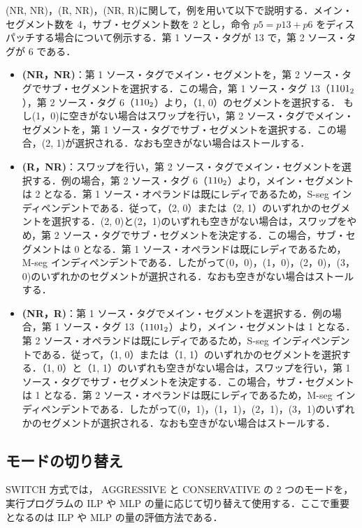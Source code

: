 (NR, NR)，(R, NR)，(NR, R)に関して，例を用いて以下で説明する．メイン・セグメント数を 4，サブ・セグメント数を 2 とし，命令 $p5 = p13 + p6$ をディスパッチする場合について例示する．第 1 ソース・タグが 13 で，第 2 ソース・タグが 6 である．
\begin{itemize}
  \item \textbf{(NR，NR)}：第 1 ソース・タグでメイン・セグメントを，第 2 ソース・タグでサブ・セグメントを選択する．この場合，第 1 ソース・タグ 13（${\rm 1101_2}$），第 2 ソース・タグ 6（${\rm 110_2}$）より，（1, 0）のセグメントを選択する． もし(1，0)に空きがない場合はスワップを行い，第 2 ソース・タグでメイン・セグメントを，第 1 ソース・タグでサブ・セグメントを選択する．この場合，(2, 1)が選択される．なおも空きがない場合はストールする．
  \item \textbf{(R，NR)}：スワップを行い，第 2 ソース・タグでメイン・セグメントを選択する．例の場合，第 2 ソース・タグ 6（${\rm 110_2}$）より，メイン・セグメントは 2 となる．第 1 ソース・オペランドは既にレディであるため，S-seg インディペンデントである．従って，（2, 0）または（2, 1）のいずれかのセグメントを選択する．(2, 0)と(2，1)のいずれも空きがない場合は，スワップをやめ，第 2 ソース・タグでサブ・セグメントを決定する．この場合，サブ・セグメントは 0 となる．第 1 ソース・オペランドは既にレディであるため，M-seg インディペンデントである．したがって(0，0)，(1，0)，(2，0)，(3，0)のいずれかのセグメントが選択される．なおも空きがない場合はストールする．
  \item \textbf{(NR，R)}：第 1 ソース・タグでメイン・セグメントを選択する．例の場合，第 1 ソース・タグ 13（${\rm 1101_2}$）より，メイン・セグメントは 1 となる．第 2 ソース・オペランドは既にレディであるため，S-seg インディペンデントである．従って，（1, 0）または（1, 1）のいずれかのセグメントを選択する．（1, 0）と（1, 1）のいずれも空きがない場合は，スワップを行い，第 1 ソース・タグでサブ・セグメントを決定する．この場合，サブ・セグメントは 1 となる．第 2 ソース・オペランドは既にレディであるため，M-seg インディペンデントである．したがって(0，1)，(1，1)，(2，1)，(3，1)のいずれかのセグメントが選択される．なおも空きがない場合はストールする．
\end{itemize}


\subsection{モードの切り替え}
SWITCH 方式では， AGGRESSIVE と CONSERVATIVE の 2 つのモードを，実行プログラムの ILP や MLP の量に応じて切り替えて使用する．ここで重要となるのは ILP や MLP の量の評価方法である．

